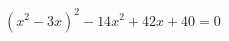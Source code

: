 \begin{ex}[type=equation]
	\begin{condition}
		\( (x^2-3x)^2-14x^2+42x+40=0 \)
	\end{condition}
\end{ex}
